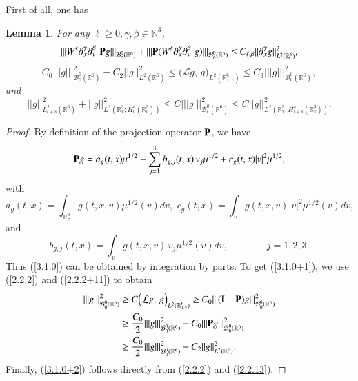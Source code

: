 \documentclass{amsart}[12pt, article]
\newtheorem{lemm}[theo]{Lemma}
\begin{document}
First of all, one has
\begin{lemm}\label{lemm3.1.1} For any $\ell\geq 0, \gamma, \beta\in  {{\mathbb N}}^3$,
\begin{equation}\label{3.1.0}
|||W^\ell\partial^{\gamma}_x\partial^{\beta}_v\,\,{{\bf P}}
g|||_{{{\mathcal B}}^0_0({{{\mathbb R}}}^6)}+|||{{\bf P}} (W^\ell
\partial^{\gamma}_x\partial^{\beta}_v\,\, g)|||_{{{\mathcal B}}^0_0({{{\mathbb R}}}^6)}
\leq C_{\ell, \beta}||\partial^{\gamma}_x
g||^2_{L^2({{{\mathbb R}}}^6)},
\end{equation}
\begin{equation}\label{3.1.0+1}
C_0|||g|||^2_{{{\mathcal B}}^0_0({{{\mathbb R}}}^6)}-C_2||g||^2_{L^2({{{\mathbb R}}}^6)} \leq \Big({{\mathcal L}}
g,\, g\Big)_{L^2({{{\mathbb R}}}^6_{x, v})}
 \leq C_3 |||g|||^2_{{{\mathcal B}}^0_0({{{\mathbb R}}}^6)},
\end{equation}
and
\begin{equation}\label{3.1.0+2}
||g||^2_{L^2_{l+s}({{{\mathbb R}}}^6)} +||g||^2_{L^2({{{\mathbb R}}}^3_x; H^s_{l}({{{\mathbb R}}}^3_v))} \leq
C|||g|||^2_{{{\mathcal B}}^0_l({{{\mathbb R}}}^6)}\leq C ||g||^2_{L^2({{{\mathbb R}}}^3_x;
H^{s}_{l+s}({{{\mathbb R}}}^3_v))}.
\end{equation}
\end{lemm}

\begin{proof} By definition of the projection operator ${{\bf P}}$, we have
$$
{{\bf P}} g = a_g (t,x) \mu^{1/2} + \sum^3_{j=1} b_{g, j} (t,x)\, v_j
\mu^{1/2} + c_ g (t,x) | v|^2 \mu^{1/2},
$$
with
\[
a_g (t, x) = \int_{{{{\mathbb R}}}^3_v} g(t,x,v) \mu^{1/2} (v) dv,\,\, c_g (t,x)
= \int_v g(t,x,v) | v|^2 \mu^{1/2}(v) dv,
\]
and
\[
b_{g, j}(t, x) = \int_v g (t,x,v)\, v_j \mu^{1/2} (v) dv,\qquad\qquad j=1,2,3.
\]
Thus (\ref{3.1.0}) can be obtained by integration by parts.
To get (\ref{3.1.0+1}), we use (\ref{2.2.2}) and (\ref{2.2.2+11})
to obtain
\begin{align*}
|||g|||^2_{{{\mathcal B}}^0_0({{{\mathbb R}}}^6)}&\geq C \Big({{\mathcal L}}
g,\, g\Big)_{L^2({{{\mathbb R}}}^6_{x, v})}
\geq C_0|||({{\bf I}}-{{\bf P}}) g|||^2_{{{\mathcal B}}^0_0({{{\mathbb R}}}^6)}\\
&\geq \frac{C_0}{2}|||g|||^2_{{{\mathcal B}}^0_0({{{\mathbb R}}}^6)}-
C_0|||{{\bf P}} g|||^2_{{{\mathcal B}}^0_0({{{\mathbb R}}}^6)}\\
&\geq \frac{C_0}{2}|||g|||^2_{{{\mathcal B}}^0_0({{{\mathbb R}}}^6)}
-C_2||g||^2_{L^2({{{\mathbb R}}}^6)}.
\end{align*}
Finally, (\ref{3.1.0+2}) follows directly {}from (\ref{2.2.2}) and (\ref{2.2.13}).
\end{proof}
\end{document}
